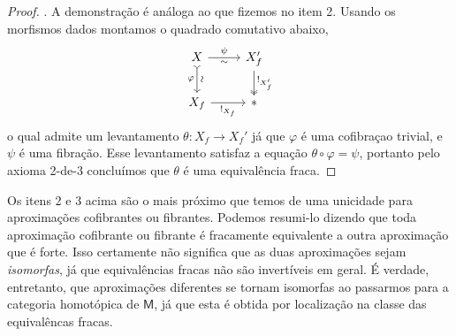 \begin{proof}
  . A demonstração é análoga ao que fizemos no item 2.
  Usando os morfismos dados montamos o quadrado comutativo abaixo,
  \begin{displaymath}
    \begin{tikzcd}
      X
      \arrow[r, "\psi", "\sim" {swap}]
      \arrow[d, tail, "\varphi" {swap}, "\sim" {sloped}]
      & X_{f}'
      \arrow[d, two heads, "!_{X_{f}'}"]
      \\ X_{f}
      \arrow[r, "!_{X_{f}}" swap]
      & *
    \end{tikzcd}
  \end{displaymath}
  o qual admite um levantamento $\theta: X_{f} \to X_{f}'$ já que $\varphi$ é uma cofibraçao trivial, e $\psi$ é uma fibração.
  Esse levantamento satisfaz a equação $\theta \circ \varphi = \psi$, portanto pelo axioma 2-de-3 concluímos que $\theta$ é uma equivalência fraca.
\end{proof}

Os itens 2 e 3 acima são o mais próximo que temos de uma unicidade para aproximações cofibrantes ou fibrantes.
Podemos resumi-lo dizendo que toda aproximação cofibrante ou fibrante é fracamente equivalente a outra aproximação que é forte.
Isso certamente não significa que as duas aproximações sejam \emph{isomorfas}, já que equivalências fracas não são invertíveis em geral.
É verdade, entretanto, que aproximações diferentes se tornam isomorfas ao passarmos para a categoria homotópica de $\mathsf{M}$, já que esta é obtida por localização na classe das equivalêncas fracas.

